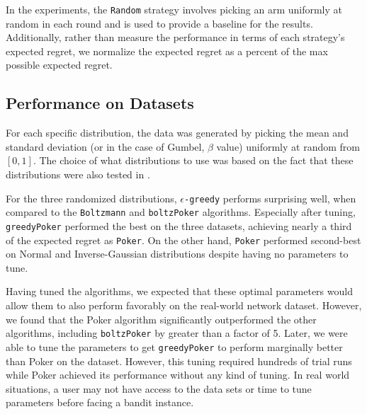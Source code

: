 \documentclass[12pt]{article}
\begin{document}
In the experiments, the \texttt{Random} strategy involves picking an arm uniformly at random in each round and is used to provide a baseline for the results.  Additionally,
rather than measure the performance in terms of each strategy's expected regret, we normalize the expected regret as a percent of the max possible expected regret. 

\subsection{Performance on Datasets}
For each specific distribution, the data was generated by picking the mean and standard deviation (or in the case of Gumbel, $\beta$ value) uniformly at random from $[0,1]$.  The choice of what
distributions to use was based on the fact that these distributions were also tested in \cite{Kuleshov}. 

For the three randomized distributions, \texttt{$\epsilon$-greedy} performs surprising well, when compared to the \texttt{Boltzmann} and \texttt{boltzPoker} algorithms.  Especially after tuning, 
\texttt{greedyPoker} performed the best on the three datasets, achieving nearly a third of the expected regret as \texttt{Poker}.  On the other hand, \texttt{Poker} performed second-best
on Normal and Inverse-Gaussian distributions despite having no parameters to tune.

Having tuned the algorithms, we expected that these optimal parameters would allow them to also perform favorably on the real-world network dataset. However, we found that
the Poker algorithm significantly outperformed the other algorithms, including \texttt{boltzPoker} by greater than a factor of 5. Later, we were able to tune the parameters
to get \texttt{greedyPoker} to perform marginally better than Poker on the dataset. However, this tuning required hundreds of trial runs while Poker achieved its performance
without any kind of tuning. In real world situations, a user may not have access to the data sets or time to tune parameters before facing a bandit instance.
\end{document}
